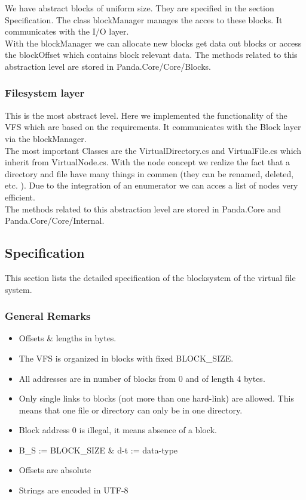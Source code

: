 \documentclass[a4paper,12pt]{article}
\begin{document}
We have abstract blocks of uniform size. They are specified in the section Specification. The class blockManager manages the acces to these blocks. It communicates with the I/O layer.\\

With the blockManager we can allocate new blocks get data out blocks or access the blockOffset which contains block relevant data. The methods related to this abstraction level are stored in Panda.Core/Core/Blocks.

\subsubsection{Filesystem layer}

This is the most abstract level. Here we implemented the functionality of the VFS which are based on the requirements. It communicates with the Block layer via the blockManager.\\

The most important Classes are the VirtualDirectory.cs and VirtualFile.cs which inherit from VirtualNode.cs. With the node concept we realize the fact that a directory and file have many things in commen (they can be renamed, deleted, etc. ). Due to the integration of an enumerator we can acces a list of nodes very efficient.\\

The methods related to this abstraction level are stored in Panda.Core and  Panda.Core/Core/Internal.

\subsection{Specification}

This section lists the detailed specification of the blocksystem of the virtual file system.

\subsubsection{General Remarks}

\begin{itemize}
	\item Offsets \& lengths in bytes.
	\item The VFS is organized in blocks with fixed BLOCK\_SIZE.
	\item All addresses are in number of blocks from 0 and of length 4 bytes.
	\item Only single links to blocks (not more than one hard-link) are allowed. This means that one file or directory can only be in one directory.
	\item Block address 0 is illegal, it means absence of a block.
	\item B\_S := BLOCK\_SIZE \& d-t := data-type
	\item Offsets are absolute
	\item Strings are encoded in UTF-8
\end{itemize}
\end{document}
